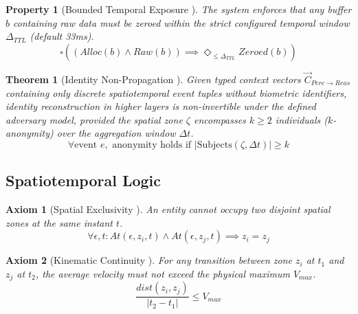 \documentclass[conference]{IEEEtran}
\newtheorem{theorem}{Theorem}
\newtheorem{axiom}{Axiom}
\newtheorem{property}{Property}
\begin{document}
\begin{property}[Bounded Temporal Exposure \cite{P19}]
The system enforces that any buffer $b$ containing raw data must be zeroed within the strict configured temporal window $\Delta_{TTL}$ (default 33ms).
\begin{equation}
\square \left( (Alloc(b) \land Raw(b)) \implies \Diamond_{\le \Delta_{TTL}} Zeroed(b) \right)
\end{equation}
\end{property}

\begin{theorem}[Identity Non-Propagation \cite{P9}]
Given typed context vectors $\vec{C}_{Perc \to Reas}$ containing only discrete spatiotemporal event tuples without biometric identifiers, identity reconstruction in higher layers is non-invertible under the defined adversary model, provided the spatial zone $\zeta$ encompasses $k \ge 2$ individuals ($k$-anonymity) over the aggregation window $\Delta t$.
\begin{equation}
\forall \text{event } e, \text{ anonymity holds if } |\text{Subjects}(\zeta, \Delta t)| \ge k
\end{equation}
\end{theorem}

\subsection{Spatiotemporal Logic}

\begin{axiom}[Spatial Exclusivity \cite{P4, P7}]
An entity cannot occupy two disjoint spatial zones at the same instant $t$.
\begin{equation}
\forall \epsilon, t: At(\epsilon, z_i, t) \land At(\epsilon, z_j, t) \implies z_i = z_j
\end{equation}
\end{axiom}

\begin{axiom}[Kinematic Continuity \cite{P7}]
For any transition between zone $z_i$ at $t_1$ and $z_j$ at $t_2$, the average velocity must not exceed the physical maximum $V_{max}$.
\begin{equation}
\frac{dist(z_i, z_j)}{|t_2 - t_1|} \le V_{max}
\end{equation}
\end{axiom}
\end{document}
